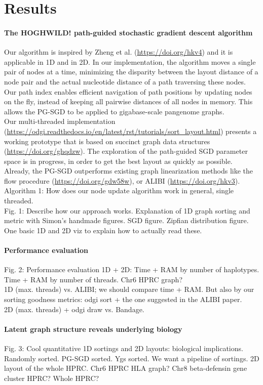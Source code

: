 \documentclass[11pt,hidelinks]{article}
\begin{document}
\section{Results}

\paragraph{The HOGHWILD! path-guided stochastic gradient descent algorithm}
Our algorithm is inspired by Zheng et al. (\url{https://doi.org/hkv4}) and it is applicable in 1D and in 2D. In our implementation, the algorithm moves a single pair of nodes at a time, minimizing the disparity between the layout distance of a node pair and the actual nucleotide distance of a path traversing these nodes. Our path index enables efficient navigation of path positions by updating nodes on the fly, instead of keeping all pairwise distances of all nodes in memory. This allows the PG-SGD to be applied to gigabase-scale pangenome graphs. \\
Our multi-threaded implementation (\url{https://odgi.readthedocs.io/en/latest/rst/tutorials/sort_layout.html}) presents a working prototype that is based on succinct graph data structures (\url{https://doi.org/ghqdzw}). The exploration of the path-guided SGD parameter space is in progress, in order to get the best layout as quickly as possible. Already, the PG-SGD outperforms existing graph linearization methods like the flow procedure (\url{https://doi.org/gdw58w}), or ALIBI (\url{https://doi.org/hkv3}).
\\
Algorithm 1: How does our node update algorithm work in general, single threaded.
\\
Fig. 1: Describe how our approach works. Explanation of 1D graph sorting and metric with Simon's handmade figures. SGD figure. Zipfian distribution figure. One basic 1D and 2D viz to explain how to actually read these.
\paragraph{Performance evaluation}
Fig. 2: Performance evaluation 1D + 2D: Time + RAM by number of haplotypes. Time + RAM by number of threads. Chr6 HPRC graph?
\\
1D (max. threads) vs. ALIBI; we should compare time + RAM. But also by our sorting goodness metrics: odgi sort + the one suggested in the ALIBI paper. 
\\
2D (max. threads) + odgi draw vs. Bandage.
\paragraph{Latent graph structure reveals underlying biology}
Fig. 3: Cool quantitative 1D sortings and 2D layouts: biological implications. Randomly sorted. PG-SGD sorted. Ygs sorted. We want a pipeline of sortings. 2D layout of the whole HPRC. Chr6 HPRC HLA graph? Chr8 beta-defensin gene cluster HPRC? Whole HPRC?
\end{document}
